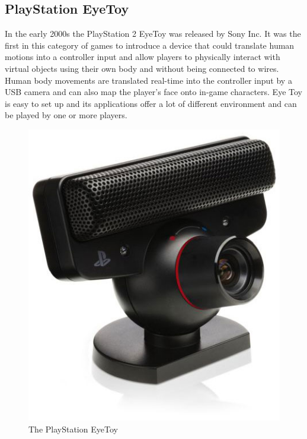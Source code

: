 \subsection{PlayStation EyeToy}
In the early 2000s the PlayStation 2 EyeToy was released by Sony Inc. It was the first in this category of games to introduce a device that could translate human motions into a controller input and allow players to physically interact with virtual objects using their own body and without being connected to wires. Human body movements are translated real-time into the controller input by a USB camera  and can also map the player’s face onto in-game characters. Eye Toy is easy to set up and its applications offer a lot of different environment and can be played by one or more players. \cite{eyetoy}
\begin{figure}[h!]
\begin{center}
\includegraphics[scale=0.3]{pseyetoy}
\caption[PlayStation EyeToy]{The PlayStation EyeToy}
\label{fig:PSEyetoy}
\end{center}
\end{figure}
